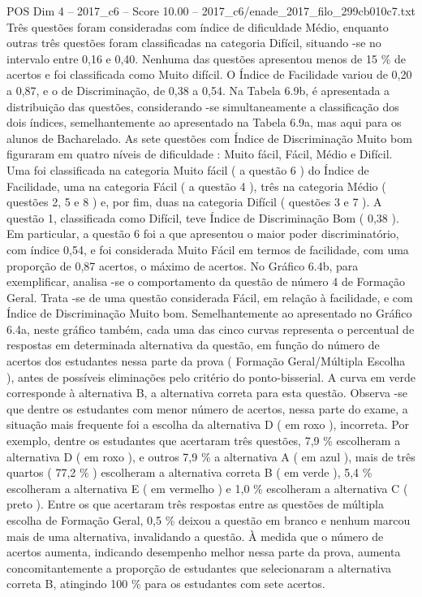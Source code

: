 \begin{textsample}{POS Dim 4 – 2017\_c6 – Score 10.00 – 2017\_c6/enade\_2017\_filo\_299cb010c7.txt}
Três questões foram consideradas com índice de dificuldade Médio, enquanto outras três questões foram classificadas na categoria Difícil, situando -se no intervalo entre 0,16 e 0,40.
Nenhuma das questões apresentou menos de 15 \% de acertos e foi classificada como Muito difícil.
O Índice de Facilidade variou de 0,20 a 0,87, e o de Discriminação, de 0,38 a 0,54.
Na Tabela 6.9b, é apresentada a distribuição das questões, considerando -se simultaneamente a classificação dos dois índices, semelhantemente ao apresentado na Tabela 6.9a, mas aqui para os alunos de Bacharelado.
As sete questões com Índice de Discriminação Muito bom figuraram em quatro níveis de dificuldade : Muito fácil, Fácil, Médio e Difícil.
Uma foi classificada na categoria Muito fácil ( a questão 6 ) do Índice de Facilidade, uma na categoria Fácil ( a questão 4 ), três na categoria Médio ( questões 2, 5 e 8 ) e, por fim, duas na categoria Difícil ( questões 3 e 7 ).
A questão 1, classificada como Difícil, teve Índice de Discriminação Bom ( 0,38 ).
Em particular, a questão 6 foi a que apresentou o maior poder discriminatório, com índice 0,54, e foi considerada Muito Fácil em termos de facilidade, com uma proporção de 0,87 acertos, o máximo de acertos.
No Gráfico 6.4b, para exemplificar, analisa -se o comportamento da questão de número 4 de Formação Geral.
Trata -se de uma questão considerada Fácil, em relação à facilidade, e com Índice de Discriminação Muito bom.
Semelhantemente ao apresentado no Gráfico 6.4a, neste gráfico também, cada uma das cinco curvas representa o percentual de respostas em determinada alternativa da questão, em função do número de acertos dos estudantes nessa parte da prova ( Formação Geral/Múltipla Escolha ), antes de possíveis eliminações pelo critério do ponto-bisserial.
A curva em verde corresponde à alternativa B, a alternativa correta para esta questão.
Observa -se que dentre os estudantes com menor número de acertos, nessa parte do exame, a situação mais frequente foi a escolha da alternativa D ( em roxo ), incorreta.
Por exemplo, dentre os estudantes que acertaram três questões, 7,9 \% escolheram a alternativa D ( em roxo ), e outros 7,9 \% a alternativa A ( em azul ), mais de três quartos ( 77,2 \% ) escolheram a alternativa correta B ( em verde ), 5,4 \% escolheram a alternativa E ( em vermelho ) e 1,0 \% escolheram a alternativa C ( preto ).
Entre os que acertaram três respostas entre as questões de múltipla escolha de Formação Geral, 0,5 \% deixou a questão em branco e nenhum marcou mais de uma alternativa, invalidando a questão.
À medida que o número de acertos aumenta, indicando desempenho melhor nessa parte da prova, aumenta concomitantemente a proporção de estudantes que selecionaram a alternativa correta B, atingindo 100 \% para os estudantes com sete acertos.

\end{textsample}
